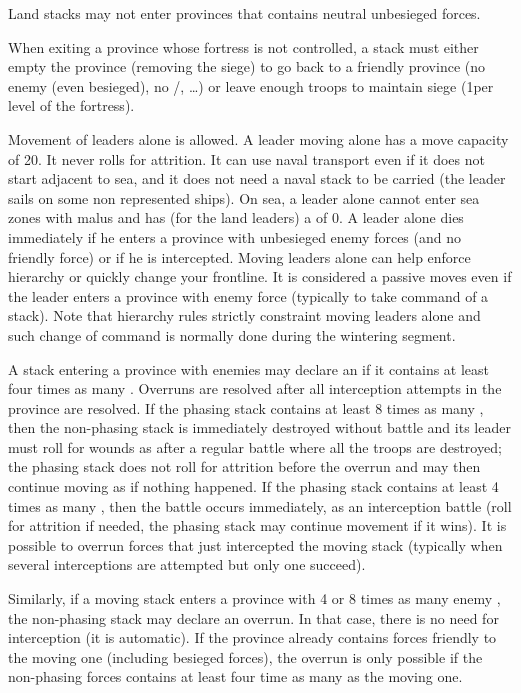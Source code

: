 Land stacks may not enter provinces that contains neutral unbesieged forces.

When exiting a province whose fortress is not controlled, a stack must either
empty the province (removing the siege) to go back to a friendly province (no
enemy (even besieged), no \REVOLT/\REBELLION, \ldots) or leave enough troops
to maintain siege (1\LD per level of the fortress).

Movement of leaders alone is allowed. A leader moving alone has a move
capacity of 20\MP. It never rolls for attrition. It can use naval transport
even if it does not start adjacent to sea, and it does not need a naval stack
to be carried (the leader sails on some non represented ships). On sea, a
leader alone cannot enter sea zones with malus and has (for the land leaders)
a \Man of 0. A leader alone dies immediately if he enters a province with
unbesieged enemy forces (and no friendly force) or if he is
intercepted. Moving leaders alone can help enforce hierarchy or quickly change
your frontline. It is considered a passive moves even if the leader enters a
province with enemy force (typically to take command of a stack). Note that
hierarchy rules strictly constraint moving leaders alone and such change of
command is normally done during the wintering segment.

A stack entering a province with enemies may declare an  if it
contains at least four times as many \LD. Overruns are resolved after all
interception attempts in the province are resolved. If the phasing stack
contains at least 8 times as many \LD, then the non-phasing stack is
immediately destroyed without battle and its leader must roll for wounds as
after a regular battle where all the troops are destroyed; the phasing stack
does not roll for attrition before the overrun and may then continue moving as
if nothing happened. If the phasing stack contains at least 4 times as many
\LD, then the battle occurs immediately, as an interception battle (roll for
attrition if needed, the phasing stack may continue movement if it wins). It
is possible to overrun forces that just intercepted the moving stack
(typically when several interceptions are attempted but only one succeed).

Similarly, if a moving stack enters a province with 4 or 8 times as many enemy
\LD, the non-phasing stack may declare an overrun. In that case, there is no
need for interception (it is automatic). If the province already contains
forces friendly to the moving one (including besieged forces), the overrun is
only possible if the non-phasing forces contains at least four time as many
\LD as the moving one.

